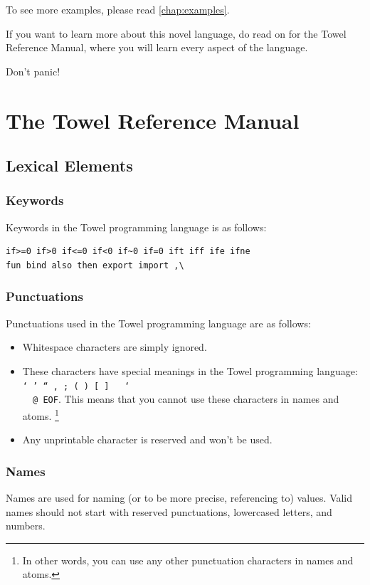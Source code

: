 \documentclass{report}
\begin{document}
To see more examples, please read \autoref{chap:examples}.

If you want to learn more about this novel language, do read on for the Towel Reference Manual, where you will learn every aspect of the language.

Don't panic!

\part{The Towel Reference Manual}

\chapter{Lexical Elements}\label{chap:grammar}
\section{Keywords}

Keywords in the Towel programming language is as follows:
\begin{verbatim}
if>=0 if>0 if<=0 if<0 if~0 if=0 ift iff ife ifne
fun bind also then export import ,\
\end{verbatim}

\section{Punctuations}

Punctuations used in the Towel programming language are as follows:

\begin{itemize}
\item Whitespace characters are simply ignored.
\item These characters have special meanings in the Towel programming language: \texttt{` ' `` , ; ( ) [ ] { } \char`\\ ~  @ EOF}. This means that you cannot use these characters in names and atoms. \footnote{In other words, you can use any other punctuation characters in names and atoms.}
\item Any unprintable character is reserved and won't be used.
\end{itemize}

\section{Names}\label{sec:def-name}

Names are used for naming (or to be more precise, referencing to) values. Valid names should not start with reserved punctuations, lowercased letters, and numbers.
\end{document}
